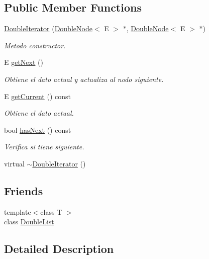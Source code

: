 \subsection*{Public Member Functions}
\begin{DoxyCompactItemize}
\item 
\hyperlink{class_double_iterator_a5b45a91dc363462fddcb4965e226e2fc}{Double\-Iterator} (\hyperlink{class_double_node}{Double\-Node}$<$ E $>$ $\ast$, \hyperlink{class_double_node}{Double\-Node}$<$ E $>$ $\ast$)
\begin{DoxyCompactList}\small\item\em Metodo constructor. \end{DoxyCompactList}\item 
E \hyperlink{class_double_iterator_aaaa1b361a61339bfee3bf86f3f67b198}{get\-Next} ()
\begin{DoxyCompactList}\small\item\em Obtiene el dato actual y actualiza al nodo siguiente. \end{DoxyCompactList}\item 
E \hyperlink{class_double_iterator_a756bb08f5352e270e08b72339c32e2be}{get\-Current} () const 
\begin{DoxyCompactList}\small\item\em Obtiene el dato actual. \end{DoxyCompactList}\item 
bool \hyperlink{class_double_iterator_adb5ef4c66649e0a4ce18e38cd85904ed}{has\-Next} () const 
\begin{DoxyCompactList}\small\item\em Verifica si tiene siguiente. \end{DoxyCompactList}\item 
virtual \hyperlink{class_double_iterator_ad41393065f15afdeb33f42ef3b01ba9b}{$\sim$\-Double\-Iterator} ()
\end{DoxyCompactItemize}
\subsection*{Friends}
\begin{DoxyCompactItemize}
\item 
{\footnotesize template$<$class T $>$ }\\class \hyperlink{class_double_iterator_ad435a9844a002995926acf522128f7a8}{Double\-List}
\end{DoxyCompactItemize}


\subsection{Detailed Description}
